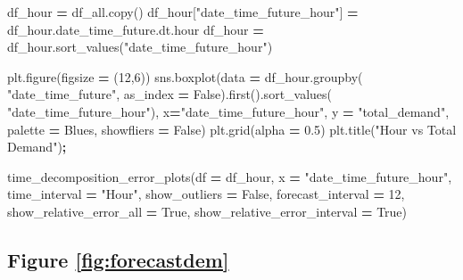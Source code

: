 \documentclass[mstat,12pt]{unswthesis}
\newenvironment{Shaded}{\begin{snugshade}}{\end{snugshade}}
\newcommand{\DecValTok}[1]{\textcolor[rgb]{0.00,0.00,0.81}{#1}}
\newcommand{\FloatTok}[1]{\textcolor[rgb]{0.00,0.00,0.81}{#1}}
\newcommand{\NormalTok}[1]{#1}
\newcommand{\OperatorTok}[1]{\textcolor[rgb]{0.81,0.36,0.00}{\textbf{#1}}}
\newcommand{\StringTok}[1]{\textcolor[rgb]{0.31,0.60,0.02}{#1}}
\newcommand{\VariableTok}[1]{\textcolor[rgb]{0.00,0.00,0.00}{#1}}
\begin{document}
\begin{Shaded}
\begin{Highlighting}[]
\NormalTok{df\_hour }\OperatorTok{=}\NormalTok{ df\_all.copy()}
\NormalTok{df\_hour[}\StringTok{"date\_time\_future\_hour"}\NormalTok{] }\OperatorTok{=}\NormalTok{ df\_hour.date\_time\_future.dt.hour}
\NormalTok{df\_hour }\OperatorTok{=}\NormalTok{ df\_hour.sort\_values(}\StringTok{"date\_time\_future\_hour"}\NormalTok{)}



\NormalTok{plt.figure(figsize }\OperatorTok{=}\NormalTok{ (}\DecValTok{12}\NormalTok{,}\DecValTok{6}\NormalTok{))}
\NormalTok{sns.boxplot(data }\OperatorTok{=}\NormalTok{ df\_hour.groupby(}
  \StringTok{"date\_time\_future"}\NormalTok{, as\_index }\OperatorTok{=} \VariableTok{False}\NormalTok{).first().sort\_values(}
      \StringTok{"date\_time\_future\_hour"}\NormalTok{), }
\NormalTok{  x}\OperatorTok{=}\StringTok{"date\_time\_future\_hour"}\NormalTok{, y }\OperatorTok{=} \StringTok{"total\_demand"}\NormalTok{, }
\NormalTok{  palette }\OperatorTok{=} \StringTok{\textquotesingle{}Blues\textquotesingle{}}\NormalTok{,   showfliers }\OperatorTok{=} \VariableTok{False}\NormalTok{)}
\NormalTok{plt.grid(alpha }\OperatorTok{=} \FloatTok{0.5}\NormalTok{)}
\NormalTok{plt.title(}\StringTok{"Hour vs Total Demand"}\NormalTok{)}\OperatorTok{;}

\NormalTok{time\_decomposition\_error\_plots(df }\OperatorTok{=}\NormalTok{ df\_hour, }
\NormalTok{    x }\OperatorTok{=} \StringTok{"date\_time\_future\_hour"}\NormalTok{, time\_interval }\OperatorTok{=} \StringTok{"Hour"}\NormalTok{,}
\NormalTok{    show\_outliers }\OperatorTok{=} \VariableTok{False}\NormalTok{, forecast\_interval }\OperatorTok{=} \DecValTok{12}\NormalTok{, }
\NormalTok{    show\_relative\_error\_all }\OperatorTok{=} \VariableTok{True}\NormalTok{, }
\NormalTok{    show\_relative\_error\_interval }\OperatorTok{=} \VariableTok{True}\NormalTok{)}
\end{Highlighting}
\end{Shaded}

\subsection*{Figure \ref{fig:forecastdem}}\label{figure-reffigforecastdem}
\end{document}

